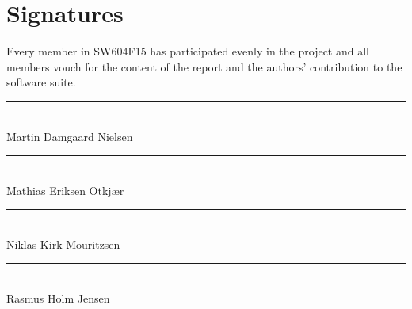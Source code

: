
\chapter*{Signatures}
Every member in SW604F15 has participated evenly in the project and all members vouch for the content of the report and the authors' contribution to the \giraf software suite.

\vspace{1cm}

\vspace*{\fill}


\noindent
\rule{9cm}{1pt}				\\
\vspace{1.5cm}
Martin Damgaard Nielsen		\\


\noindent
\rule{9cm}{1pt}				\\
\vspace{1.5cm}
Mathias Eriksen Otkjær	    \\


\noindent
\rule{9cm}{1pt}				\\
\vspace{1.5cm}
Niklas Kirk Mouritzsen		\\


\noindent
\rule{9cm}{1pt}				\\
\vspace{1.5cm}
Rasmus Holm Jensen			\\

\vspace*{\fill}